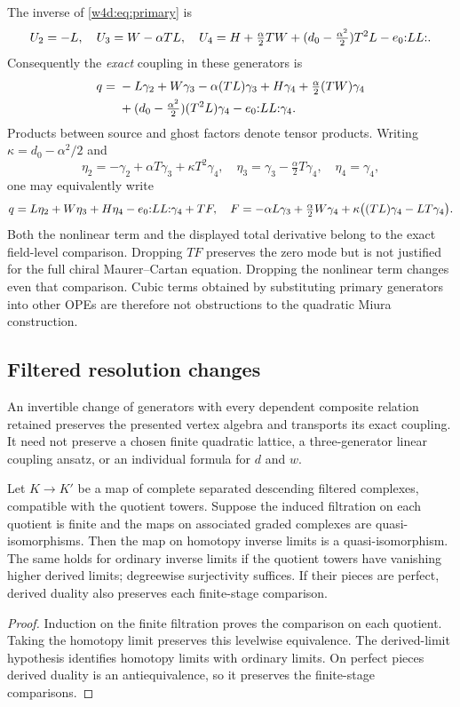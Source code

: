 The inverse of \eqref{w4d:eq:primary} is
\[
 U_2=-L,\quad U_3=W-\alpha TL,\quad
 U_4=H+\tfrac\alpha2TW+(d_0-\tfrac{\alpha^2}{2})T^2L-e_0\mathopen{:}LL\mathclose{:}.
\]
Consequently the \emph{exact} coupling in these generators is
\begin{align}\label{w4d:eq:primary-coupling}
 q={}&-L\gamma_2+W\gamma_3-\alpha(TL)\gamma_3
   +H\gamma_4+\tfrac\alpha2(TW)\gamma_4\notag\\
 &+(d_0-\tfrac{\alpha^2}{2})(T^2L)\gamma_4-e_0\mathopen{:}LL\mathclose{:}\gamma_4.
\end{align}
Products between source and ghost factors denote tensor products. Writing $\kappa=d_0-\alpha^2/2$ and
\[
 \eta_2=-\gamma_2+\alpha T\gamma_3+\kappa T^2\gamma_4,
 \quad\eta_3=\gamma_3-\tfrac\alpha2T\gamma_4,\quad\eta_4=\gamma_4,
\]
one may equivalently write
\[
 q=L\eta_2+W\eta_3+H\eta_4-e_0\mathopen{:}LL\mathclose{:}\gamma_4+TF,
 \quad
 F=-\alpha L\gamma_3+\tfrac\alpha2W\gamma_4
       +\kappa\bigl((TL)\gamma_4-LT\gamma_4\bigr).
\]
Both the nonlinear term and the displayed total derivative belong to the exact field-level comparison. Dropping $TF$ preserves the zero mode but is not justified for the full chiral Maurer--Cartan equation. Dropping the nonlinear term changes even that comparison. Cubic terms obtained by substituting primary generators into other OPEs are therefore not obstructions to the quadratic Miura construction.

\subsection{Filtered resolution changes}
An invertible change of generators with every dependent composite relation retained preserves the presented vertex algebra and transports its exact coupling. It need not preserve a chosen finite quadratic lattice, a three-generator linear coupling ansatz, or an individual formula for $d$ and $w$.

\begin{proposition}\label{w4d:prop:filtered-comparison}
Let $K\to K'$ be a map of complete separated descending filtered
complexes, compatible with the quotient towers. Suppose the induced
filtration on each quotient is finite and the maps on associated
graded complexes are quasi-isomorphisms. Then the map on homotopy
inverse limits is a quasi-isomorphism. The same holds for ordinary
inverse limits if the quotient towers have vanishing higher derived
limits; degreewise surjectivity suffices. If their pieces are perfect,
derived duality also preserves each finite-stage comparison.
\end{proposition}
\begin{proof}
Induction on the finite filtration proves the comparison on each
quotient. Taking the homotopy limit preserves this levelwise
equivalence. The derived-limit hypothesis identifies homotopy limits
with ordinary limits. On perfect pieces derived duality is an
antiequivalence, so it preserves the finite-stage comparisons.
\end{proof}

